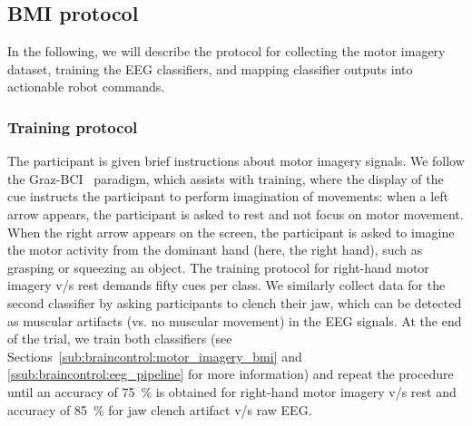 \subsection{BMI protocol}\label{sub:braincontrol:bmi_protocol}
In the following, we will describe the protocol for collecting the motor imagery dataset, training the \gls{EEG} classifiers, and mapping classifier outputs into actionable robot commands.

\subsubsection{Training protocol}

The participant is given brief instructions about motor imagery signals.
We follow the Graz-BCI~\cite{roc2021review} paradigm, which assists with training, where the display of the cue instructs the participant to perform imagination of movements: when a left arrow appears, the participant is asked to rest and not focus on motor movement. When the right arrow appears on the screen, the participant is asked to imagine the motor activity from the dominant hand (here, the right hand), such as grasping or squeezing an object. The training protocol for right-hand motor imagery v/s rest demands fifty cues per class. 
We similarly collect data for the second classifier by asking participants to clench their jaw, which can be detected as muscular artifacts (vs. no muscular movement) in the \gls{EEG} signals.
At the end of the trial, we train both classifiers (see Sections~\ref{sub:braincontrol:motor_imagery_bmi} and \ref{ssub:braincontrol:eeg_pipeline} for more information) and repeat the procedure until an accuracy of \SI{75}{\percent} is obtained for right-hand motor imagery v/s rest and accuracy of \SI{85}{\percent} for jaw clench artifact v/s raw EEG.


